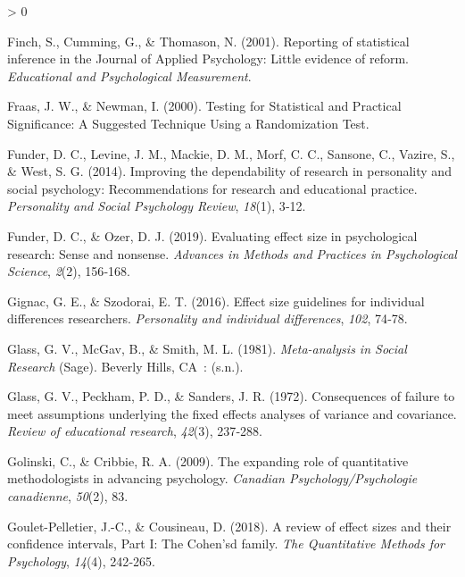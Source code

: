 \documentclass[
  12pt,
  french,
]{article}
\newlength{\cslhangindent}
\newenvironment{CSLReferences}[2] %
 {%
  \setlength{\parindent}{0pt}
  \ifodd #1 \everypar{\setlength{\hangindent}{\cslhangindent}}\ignorespaces\fi
  \ifnum #2 > 0
  \setlength{\parskip}{#2\baselineskip}
  \fi
 }%
 {}
\begin{document}
\begin{CSLReferences}{1}{0}
\leavevmode\hypertarget{ref-finch_reporting_2001}{}%
Finch, S., Cumming, G., \& Thomason, N. (2001). Reporting of statistical
inference in the Journal of Applied Psychology: Little evidence of
reform. \emph{Educational and Psychological Measurement}.

\leavevmode\hypertarget{ref-fraas_testing_2000}{}%
Fraas, J. W., \& Newman, I. (2000). Testing for Statistical and
Practical Significance: A Suggested Technique Using a Randomization
Test.

\leavevmode\hypertarget{ref-funder_improving_2014}{}%
Funder, D. C., Levine, J. M., Mackie, D. M., Morf, C. C., Sansone, C.,
Vazire, S., \& West, S. G. (2014). Improving the dependability of
research in personality and social psychology: Recommendations for
research and educational practice. \emph{Personality and Social
Psychology Review}, \emph{18}(1), 3‑12.

\leavevmode\hypertarget{ref-funder_evaluating_2019}{}%
Funder, D. C., \& Ozer, D. J. (2019). Evaluating effect size in
psychological research: Sense and nonsense. \emph{Advances in Methods
and Practices in Psychological Science}, \emph{2}(2), 156‑168.

\leavevmode\hypertarget{ref-gignac_effect_2016}{}%
Gignac, G. E., \& Szodorai, E. T. (2016). Effect size guidelines for
individual differences researchers. \emph{Personality and individual
differences}, \emph{102}, 74‑78.

\leavevmode\hypertarget{ref-glass_meta-analysis_1981}{}%
Glass, G. V., McGav, B., \& Smith, M. L. (1981). \emph{Meta-analysis in
Social Research} (Sage). Beverly Hills, {CA}~: (s.n.).

\leavevmode\hypertarget{ref-glass_consequences_1972}{}%
Glass, G. V., Peckham, P. D., \& Sanders, J. R. (1972). Consequences of
failure to meet assumptions underlying the fixed effects analyses of
variance and covariance. \emph{Review of educational research},
\emph{42}(3), 237‑288.

\leavevmode\hypertarget{ref-golinski_expanding_2009}{}%
Golinski, C., \& Cribbie, R. A. (2009). The expanding role of
quantitative methodologists in advancing psychology. \emph{Canadian
Psychology/Psychologie canadienne}, \emph{50}(2), 83.

\leavevmode\hypertarget{ref-goulet-pelletier_review_2018}{}%
Goulet-Pelletier, J.-C., \& Cousineau, D. (2018). A review of effect
sizes and their confidence intervals, Part I: The Cohen'sd family.
\emph{The Quantitative Methods for Psychology}, \emph{14}(4), 242‑265.


\end{CSLReferences}
\end{document}
